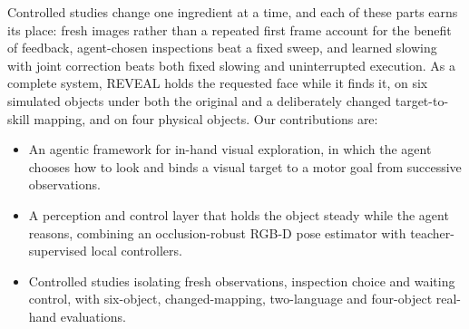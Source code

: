 Controlled studies change one ingredient at a time, and each of these parts earns its place: fresh images rather than a repeated first frame account for the benefit of feedback, agent-chosen inspections beat a fixed sweep, and learned slowing with joint correction beats both fixed slowing and uninterrupted execution. As a complete system, REVEAL holds the requested face while it finds it, on six simulated objects under both the original and a deliberately changed target-to-skill mapping, and on four physical objects. Our contributions are:
\begin{itemize}
\item An agentic framework for in-hand visual exploration, in which the agent chooses how to look and binds a visual target to a motor goal from successive observations.\item A perception and control layer that holds the object steady while the agent reasons, combining an occlusion-robust RGB-D pose estimator with teacher-supervised local controllers.
\item Controlled studies isolating fresh observations, inspection choice and waiting control, with six-object, changed-mapping, two-language and four-object real-hand evaluations.
\end{itemize}
